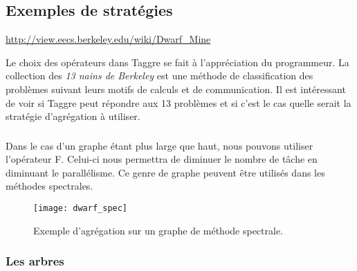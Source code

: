 \subsection{Exemples de stratégies}
\url{http://view.eecs.berkeley.edu/wiki/Dwarf_Mine}

Le choix des opérateurs dans Taggre se fait à l'appréciation du programmeur.
%
La collection des {\em 13 nains de Berkeley} est une méthode de classification des problèmes suivant leurs motifs de calculs et de communication.
%
Il est intéressant de voir si Taggre peut répondre aux 13 problèmes et si c'est le cas quelle serait la stratégie d'agrégation à utiliser.



\subsubsection{}
Dans le cas d'un graphe étant plus large que haut, nous pouvons utiliser l'opérateur F.
%
Celui-ci nous permettra de diminuer le nombre de tâche en diminuant le parallélisme.
%
Ce genre de graphe peuvent être utilisés dans les méthodes spectrales.


\begin{figure}[t!]
  \centering
  \texttt{[image: dwarf\_spec]}
  \caption{Exemple d'agrégation sur un graphe de méthode spectrale.}
  \label{fig:dwarf_spec}
\end{figure}



\subsubsection{Les arbres}
